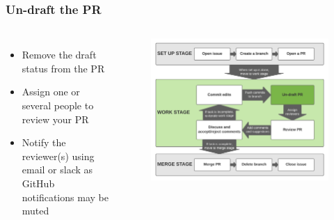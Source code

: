 \documentclass[aspectratio=169]{beamer} %
\begin{document}
\begin{frame}
	\frametitle{Un-draft the PR}
	\begin{columns}[c]

		\begin{itemize}
			\setlength\itemsep{1em}
			\item Remove the draft status from the PR
			\item Assign one or several people to review your PR
			\item Notify the reviewer(s) using email
			or slack as GitHub notifications may be muted
		\end{itemize}

		\vspace{-.75cm}
		\begin{figure}
			\centering
			\includegraphics[width=\textwidth]{./img/branch-pr-merge-cycle-S2-2.png}
		\end{figure}

	\end{columns}
\end{frame}
\end{document}
